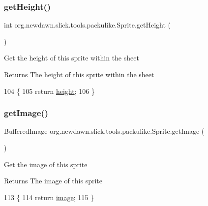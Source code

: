\subsubsection{\texorpdfstring{get\+Height()}{getHeight()}}
{\footnotesize\ttfamily int org.\+newdawn.\+slick.\+tools.\+packulike.\+Sprite.\+get\+Height (\begin{DoxyParamCaption}{ }\end{DoxyParamCaption})\hspace{0.3cm}{\ttfamily [inline]}}

Get the height of this sprite within the sheet

\begin{DoxyReturn}{Returns}
The height of this sprite within the sheet 
\end{DoxyReturn}

\begin{DoxyCode}
104                            \{
105         \textcolor{keywordflow}{return} \mbox{\hyperlink{classorg_1_1newdawn_1_1slick_1_1tools_1_1packulike_1_1_sprite_a33d551a688d84bce77065b00c4309eab}{height}};
106     \}
\end{DoxyCode}
\mbox{\label{classorg_1_1newdawn_1_1slick_1_1tools_1_1packulike_1_1_sprite_a59f9f148d202bc3c25680bfd0bc7660c}} 
\subsubsection{\texorpdfstring{get\+Image()}{getImage()}}
{\footnotesize\ttfamily Buffered\+Image org.\+newdawn.\+slick.\+tools.\+packulike.\+Sprite.\+get\+Image (\begin{DoxyParamCaption}{ }\end{DoxyParamCaption})\hspace{0.3cm}{\ttfamily [inline]}}

Get the image of this sprite

\begin{DoxyReturn}{Returns}
The image of this sprite 
\end{DoxyReturn}

\begin{DoxyCode}
113                                     \{
114         \textcolor{keywordflow}{return} \mbox{\hyperlink{classorg_1_1newdawn_1_1slick_1_1tools_1_1packulike_1_1_sprite_a021954101cf2a5afc580af29559ab4e5}{image}};
115     \}
\end{DoxyCode}
\mbox{\label{classorg_1_1newdawn_1_1slick_1_1tools_1_1packulike_1_1_sprite_a482ded8b99a8590bb19b3afafc515ff0}} 
